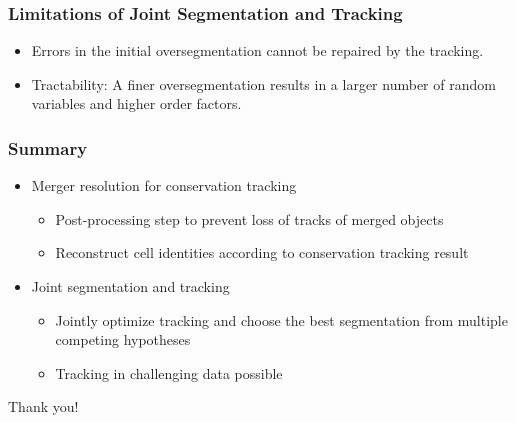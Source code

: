 \begin{frame}
    \frametitle{Limitations of Joint Segmentation and Tracking}
    \begin{itemize}
          \item<1-> Errors in the initial oversegmentation cannot be repaired by the tracking.
          \item<2-> Tractability: A finer oversegmentation results in a larger number of random variables
        and higher order factors.
    \end{itemize}
\end{frame}


\begin{frame}
    \frametitle{Summary}
    \begin{itemize}
          \item<1-> Merger resolution for conservation tracking
        \begin{itemize}
              \item Post-processing step to prevent loss of tracks of merged objects
              \item Reconstruct cell identities according to conservation tracking result
        \end{itemize}
          \item<2-> Joint segmentation and tracking
        \begin{itemize}
              \item Jointly optimize tracking and choose the best segmentation from multiple
            competing hypotheses
              \item Tracking in challenging data possible
        \end{itemize}
    \end{itemize}
\end{frame}


\begin{frame}
    \begin{center}
        Thank you!
    \end{center}
\end{frame}


